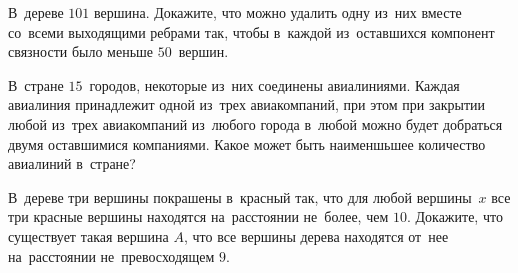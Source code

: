 \begin{problems}

\item
В~дереве $101$ вершина.
Докажите, что можно удалить одну из~них вместе со~всеми выходящими ребрами так,
чтобы в~каждой из~оставшихся компонент связности было меньше $50$~вершин.

\item
В~стране $15$~городов, некоторые из~них соединены авиалиниями.
Каждая авиалиния принадлежит одной из~трех авиакомпаний, при этом при закрытии
любой из~трех авиакомпаний из~любого города в~любой можно будет добраться двумя
оставшимися компаниями.
Какое может быть наименшьшее количество авиалиний в~стране?

\item
В~дереве три вершины покрашены в~красный так, что для любой вершины~$x$ все три
красные вершины находятся на~расстоянии не~более, чем $10$.
Докажите, что существует такая вершина $A$, что все вершины дерева находятся
от~нее на~расстоянии не~превосходящем $9$.

\end{problems}

